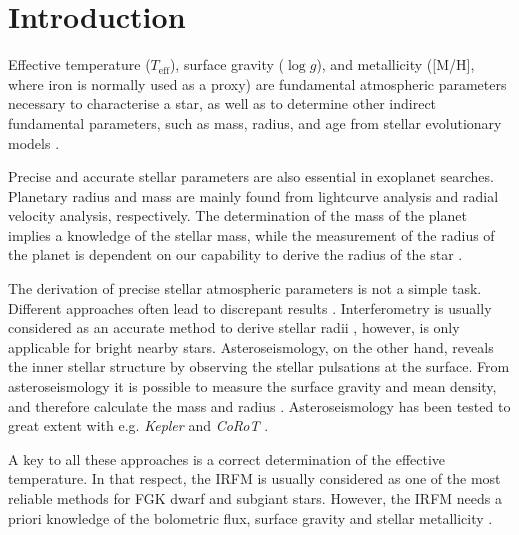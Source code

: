 \documentclass{aa}
\begin{document}
\maketitle



\section{Introduction}
\label{sec:introduction}

Effective temperature ($T_\mathrm{eff}$), surface gravity ($\log g$),
and metallicity ([M/H], where iron is normally used as a proxy)
are fundamental atmospheric parameters necessary to characterise a
star, as well as to determine other indirect fundamental parameters,
such as mass, radius, and age from stellar evolutionary models
\citep[see e.g.][]{Girardi2000,Dotter2008,Baraffe2015}.

Precise and accurate stellar parameters are also essential in
exoplanet searches. Planetary radius and mass are mainly found from
lightcurve analysis and radial velocity analysis, respectively. The
determination of the mass of the planet implies a knowledge of the
stellar mass, while the measurement of the radius of the planet
is dependent on our capability to derive the radius of the star
\citep[see e.g.][]{Ammler2009,Torres2008,Torres2012}.

The derivation of precise stellar atmospheric parameters is not a simple
task. Different approaches often lead to discrepant results \citep[see
e.g.][]{Santos13}. Interferometry is usually considered as an accurate
method to derive stellar radii \citep[e.g.][]{Boyajian2012}, however,
is only applicable for bright nearby stars. Asteroseismology, on the
other hand, reveals the inner stellar structure by observing the stellar
pulsations at the surface. From asteroseismology it is possible to
measure the surface gravity and mean density, and therefore calculate
the mass and radius \citep[e.g.][]{Kjeldsen1995}. Asteroseismology has
been tested to great extent with e.g. \emph{Kepler} and \emph{CoRoT}
\citep{Michel2008,Huber2011,Huber2012}.

A key to all these approaches is a correct determination of the
effective temperature. In that respect, the IRFM is usually
considered as one of the most reliable methods for FGK dwarf
and subgiant stars. However, the IRFM needs a priori knowledge
of the bolometric flux, surface gravity and stellar metallicity
\citep{Blackwell1977,Ramirez2005b,Casagrande2010}.
\end{document}
